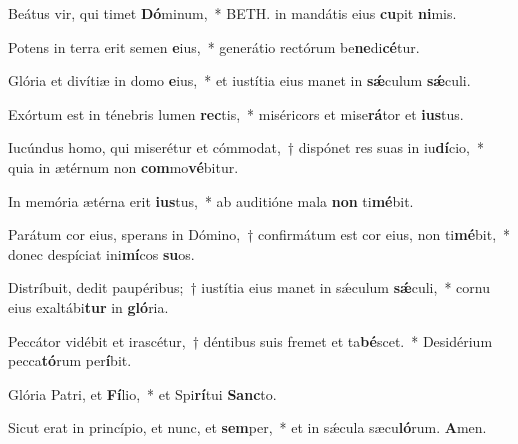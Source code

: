\item Beátus vir, qui timet \textbf{Dó}minum,~* BETH. in mandátis eius \textbf{cu}pit \textbf{ni}mis.

\item Potens in terra erit semen \textbf{e}ius,~* generátio rectórum be\textbf{ne}di\textbf{cé}tur.

\item Glória et divítiæ in domo \textbf{e}ius,~* et iustítia eius manet in \textbf{sǽ}culum \textbf{sǽ}culi.

\item Exórtum est in ténebris lumen \textbf{rec}tis,~* miséricors et mise\textbf{rá}tor et \textbf{ius}tus.

\item Iucúndus homo, qui miserétur et cómmodat,~† dispónet res suas in iu\textbf{dí}cio,~* quia in ætérnum non \textbf{com}mo\textbf{vé}bitur.

\item In memória ætérna erit \textbf{ius}tus,~* ab auditióne mala \textbf{non} ti\textbf{mé}bit.

\item Parátum cor eius, sperans in Dómino,~† confirmátum est cor eius, non ti\textbf{mé}bit,~* donec despíciat ini\textbf{mí}cos \textbf{su}os.

\item Distríbuit, dedit paupéribus;~† iustítia eius manet in sǽculum \textbf{sǽ}culi,~* cornu eius exaltábi\textbf{tur} in \textbf{gló}ria.

\item Peccátor vidébit et irascétur,~† déntibus suis fremet et ta\textbf{bé}scet.~* Desidérium pecca\textbf{tó}rum per\textbf{í}bit.

\item Glória Patri, et \textbf{Fí}lio,~* et Spi\textbf{rí}tui \textbf{Sanc}to.

\item Sicut erat in princípio, et nunc, et \textbf{sem}per,~* et in sǽcula sæcu\textbf{ló}rum. \textbf{A}men.